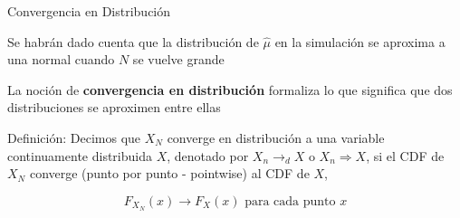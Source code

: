\documentclass[11pt,handout,aspectratio=169]{beamer}
\newenvironment{wideitemize}{\itemize\addtolength{\itemsep}{10pt}}{\enditemize}
\begin{document}
\begin{frame}{Convergencia en Distribución}
	
	\begin{wideitemize}

		\item
		Se habrán dado cuenta que la distribución de $\hat\mu$ en la simulación se aproxima a una normal cuando $N$ se vuelve grande
		
		\item
		La noción de \textbf{convergencia en distribución} formaliza lo que significa que dos distribuciones se aproximen  entre ellas		
		
		\pause
		\item
		Definición: Decimos que $X_N$ converge en distribución a una variable continuamente distribuida $X$, denotado por $X_n \rightarrow_d X$ o $X_n \Rightarrow X$, si el CDF de $X_N$ converge (punto por punto - pointwise) al CDF de $X$,
		
		$$F_{X_N}(x) \rightarrow F_{X}(x) \text{ para cada punto } x$$ 
		
		
%		
	\end{wideitemize}
	
\end{frame}
\end{document}
